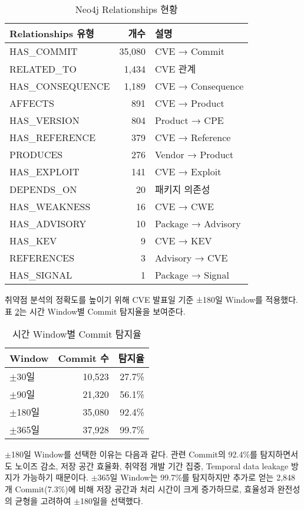 ﻿\documentclass[conference]{IEEEtran}
\begin{document}
\begin{table}[h]
\centering
\caption{Neo4j Relationships 현황}
\label{tab:neo4j_relationships}
\begin{tabular}{lrl}
\toprule
\textbf{Relationships 유형} & \textbf{개수} & \textbf{설명} \\
\midrule
HAS\_COMMIT & 35,080 & CVE → Commit \\
RELATED\_TO & 1,434 & CVE 관계 \\
HAS\_CONSEQUENCE & 1,189 & CVE → Consequence \\
AFFECTS & 891 & CVE → Product \\
HAS\_VERSION & 804 & Product → CPE \\
HAS\_REFERENCE & 379 & CVE → Reference \\
PRODUCES & 276 & Vendor → Product \\
HAS\_EXPLOIT & 141 & CVE → Exploit \\
DEPENDS\_ON & 20 & 패키지 의존성 \\
HAS\_WEAKNESS & 16 & CVE → CWE \\
HAS\_ADVISORY & 10 & Package → Advisory \\
HAS\_KEV & 9 & CVE → KEV \\
REFERENCES & 3 & Advisory → CVE \\
HAS\_SIGNAL & 1 & Package → Signal \\
\bottomrule
\end{tabular}
\end{table}

취약점 분석의 정확도를 높이기 위해 CVE 발표일 기준 ±180일 Window를 적용했다. 표 \ref{tab:time_window}는 시간 Window별 Commit 탐지율을 보여준다.

\begin{table}[h]
\centering
\caption{시간 Window별 Commit 탐지율}
\label{tab:time_window}
\begin{tabular}{lrr}
\toprule
\textbf{Window} & \textbf{Commit 수} & \textbf{탐지율} \\
\midrule
$\pm$30일 & 10,523 & 27.7\% \\
$\pm$90일 & 21,320 & 56.1\% \\
$\pm$180일 & 35,080 & 92.4\% \\
$\pm$365일 & 37,928 & 99.7\% \\
\bottomrule
\end{tabular}
\end{table}

$\pm$180일 Window를 선택한 이유는 다음과 같다. 관련 Commit의 92.4\%를 탐지하면서도 노이즈 감소, 저장 공간 효율화, 취약점 개발 기간 집중, Temporal data leakage 방지가 가능하기 때문이다. $\pm$365일 Window는 99.7\%를 탐지하지만 추가로 얻는 2,848개 Commit(7.3\%)에 비해 저장 공간과 처리 시간이 크게 증가하므로, 효율성과 완전성의 균형을 고려하여 $\pm$180일을 선택했다.
\end{document}

